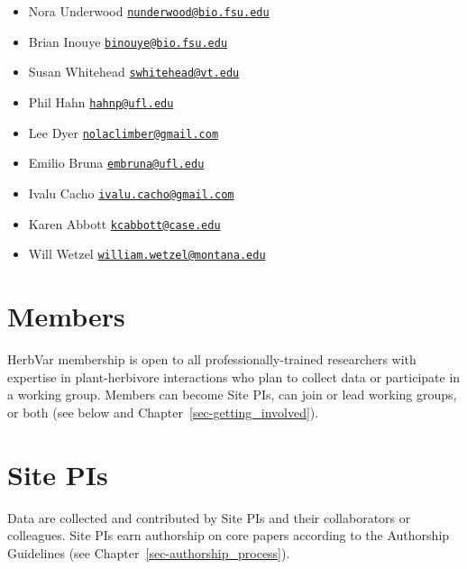 \documentclass[
  letterpaper,
  oneside,
  open=any]{scrbook}
\providecommand{\tightlist}{%
  \setlength{\itemsep}{0pt}\setlength{\parskip}{0pt}}\usepackage{longtable,booktabs,array}
\begin{document}
\begin{itemize}
\tightlist
\item
  Nora Underwood
  \href{mailto:nunderwood@bio.fsu.edu}{\nolinkurl{nunderwood@bio.fsu.edu}}\\
\item
  Brian Inouye
  \href{mailto:binouye@bio.fsu.edu}{\nolinkurl{binouye@bio.fsu.edu}}\\
\item
  Susan Whitehead
  \href{mailto:swhitehead@vt.edu}{\nolinkurl{swhitehead@vt.edu}}\\
\item
  Phil Hahn \href{mailto:hahnp@ufl.edu}{\nolinkurl{hahnp@ufl.edu}}\\
\item
  Lee Dyer
  \href{mailto:nolaclimber@gmail.com}{\nolinkurl{nolaclimber@gmail.com}}\\
\item
  Emilio Bruna
  \href{mailto:embruna@ufl.edu}{\nolinkurl{embruna@ufl.edu}}\\
\item
  Ivalu Cacho
  \href{mailto:ivalu.cacho@gmail.com}{\nolinkurl{ivalu.cacho@gmail.com}}\\
\item
  Karen Abbott
  \href{mailto:kcabbott@case.edu}{\nolinkurl{kcabbott@case.edu}}\\
\item
  Will Wetzel
  \href{mailto:william.wetzel@montana.edu}{\nolinkurl{william.wetzel@montana.edu}}
\end{itemize}

\section{Members}\label{members}

HerbVar membership is open to all professionally-trained researchers
with expertise in plant-herbivore interactions who plan to collect data
or participate in a working group. Members can become Site PIs, can join
or lead working groups, or both (see below and
Chapter~\ref{sec-getting_involved}).

\section{Site PIs}\label{site-pis}

Data are collected and contributed by Site PIs and their collaborators
or colleagues. Site PIs earn authorship on core papers according to the
Authorship Guidelines (see Chapter~\ref{sec-authorship_process}).
\end{document}
